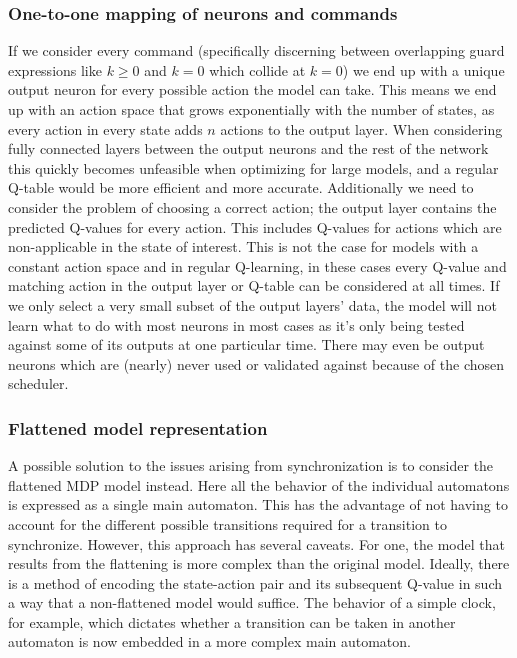 \subsubsection{One-to-one mapping of neurons and commands}
If we consider every command (specifically discerning between overlapping guard expressions like $k \ge 0$ and $k = 0$ which collide at $k = 0$) we end up with a unique output neuron for every possible action the model can take. This means we end up with an action space that grows exponentially with the number of states, as every action in every state adds $n$ actions to the output layer. When considering fully connected layers between the output neurons and the rest of the network this quickly becomes unfeasible when optimizing for large models, and a regular Q-table would be more efficient and more accurate. Additionally we need to consider the problem of choosing a correct action; the output layer contains the predicted Q-values for every action. This includes Q-values for actions which are non-applicable in the state of interest. This is not the case for models with a constant action space and in regular Q-learning, in these cases every Q-value and matching action in the output layer or Q-table can be considered at all times. If we only select a very small subset of the output layers' data, the model will not learn what to do with most neurons in most cases as it's only being tested against some of its outputs at one particular time. There may even be output neurons which are (nearly) never used or validated against because of the chosen scheduler.

\subsubsection{Flattened model representation}
A possible solution to the issues arising from synchronization is to consider the flattened MDP model instead. Here all the behavior of the individual automatons is expressed as a single main automaton. This has the advantage of not having to account for the different possible transitions required for a transition to synchronize. However, this approach has several caveats. For one, the model that results from the flattening is more complex than the original model. Ideally, there is a method of encoding the state-action pair and its subsequent Q-value in such a way that a non-flattened model would suffice. The behavior of a simple clock, for example, which dictates whether a transition can be taken in another automaton is now embedded in a more complex main automaton.


